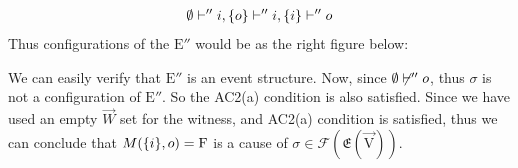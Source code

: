 \begin{example}
\begin{align*}
        \emptyset \vdash'' i, \{o\} \vdash'' i, \{i\} \vdash '' o
    \end{align*}
    Thus configurations of the $\mathrm{E''}$ would be as the right figure
    below:
    \begin{center}
    \end{center}
    We can easily verify that $\mathrm{E}''$ is an event structure.
    Now, since $\emptyset \not \vdash'' o$, thus $\sigma$ is not a configuration
    of $\mathrm{E}''$.
    So the AC2(a) condition is also satisfied.
    Since we have used an empty $\vec W$ set for the witness, and AC2(a)
    condition is satisfied, thus we can conclude that $M(\{i\},o) = \mathrm{F}$ is a
    cause of $\sigma \in \mathcal{F}(\mathrm{\mathfrak{E}( \vec V)})$.
\end{example}

